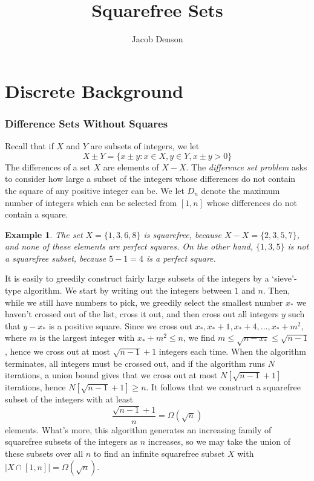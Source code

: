 \documentclass{article}
\title{Squarefree Sets}
\author{Jacob Denson}
\theoremstyle{plain}
\newtheorem*{example}{Example}
\theoremstyle{plain}
\begin{document}
\maketitle

\tableofcontents

\part{Discrete Background}

\section{Difference Sets Without Squares}

Recall that if $X$ and $Y$ are subsets of integers, we let
%
\[ X \pm Y = \{ x \pm y: x \in X, y \in Y, x \pm y > 0 \} \]
%
The differences of a set $X$ are elements of $X - X$. The {\it difference set problem} asks to consider how large a subset of the integers whose differences do not contain the square of any positive integer can be. We let $D_n$ denote the maximum number of integers which can be selected from $[1,n]$ whose differences do not contain a square.

\begin{example}
    The set $X = \{ 1, 3, 6, 8 \}$ is squarefree, because $X - X = \{ 2, 3, 5, 7 \}$, and none of these elements are perfect squares. On the other hand, $\{ 1, 3, 5 \}$ is not a squarefree subset, because $5 - 1 = 4$ is a perfect square.
\end{example}

It is easily to greedily construct fairly large subsets of the integers by a `sieve'-type algorithm. We start by writing out the integers between $1$ and $n$. Then, while we still have numbers to pick, we greedily select the smallest number $x_*$ we haven't crossed out of the list, cross it out, and then cross out all integers $y$ such that $y - x_*$ is a positive square. Since we cross out $x_*, x_* + 1, x_* + 4, \dots, x_* + m^2$, where $m$ is the largest integer with $x_* + m^2 \leq n$, we find $m \leq \sqrt{n - x_*} \leq \sqrt{n-1}$, hence we cross out at most $\sqrt{n-1} + 1$ integers each time. When the algorithm terminates, all integers must be crossed out, and if the algorithm runs $N$ iterations, a union bound gives that we cross out at most $N[\sqrt{n-1} + 1]$ iterations, hence $N[\sqrt{n-1} + 1] \geq n$. It follows that we construct a squarefree subset of the integers with at least
%
\[ \frac{\sqrt{n-1} + 1}{n} = \Omega(\sqrt{n}) \]
%
elements. What's more, this algorithm generates an increasing family of squarefree subsets of the integers as $n$ increases, so we may take the union of these subsets over all $n$ to find an infinite squarefree subset $X$ with $|X \cap [1,n]| = \Omega(\sqrt{n})$.
\end{document}
